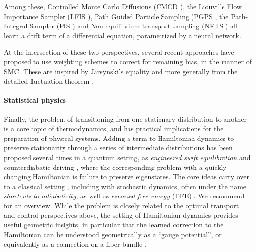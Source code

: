 \documentclass{article}
\begin{document}
Among these, Controlled Monte Carlo Diffusions (CMCD \cite{vargas2023transport}), the Liouville Flow Importance Sampler (LFIS \cite{tian2024liouville}), Path Guided Particle Sampling (PGPS \cite{fan2024path}, the Path-Integral Sampler (PIS \cite{zhang2021path}) and Non-equilibrium transport sampling (NETS \cite{albergo2024nets}) all learn a drift term of a differential equation, parametrized by a neural network.


At the intersection of these two perspectives, several recent approaches \cite{albergo2024nets, vargas2023transport} have proposed to use weighting schemes to correct for remaining bias, in the manner of SMC. These are inspired by Jarsynski's equality \cite{jarzynski1997nonequilibrium} and more generally from the detailed fluctuation theorem \cite{crooks1998nonequilibrium}.

\paragraph{Statistical physics} Finally, the problem of transitioning from one stationary distribution to another is a core topic of thermodynamics, and has practical implications for the preparation of physical systems. Adding a term to Hamiltonian dynamics to preserve stationarity through a series of intermediate distributions has been proposed several times in a quantum setting, as \emph{engineered swift equilibration} \cite{martinez2016engineered} and counterdiabatic driving \cite{demirplak2003adiabatic}, where the corresponding problem with a quickly changing Hamiltonian is failure to preserve eigenstates. The core ideas carry over to a classical setting \cite{patra2017shortcuts}, including with stochastic dynamics, often under the name \emph{shortcuts to adiabaticity}, as well as \emph{escorted free energy} (EFE) \cite{vaikuntanathan2011escorted}. We recommend \cite{guery2019shortcuts} for an overview. While the problem is closely related to the optimal transport and control perspectives above, the setting of Hamiltonian dynamics provides useful geometric insights, in particular that the  learned correction to the Hamiltonian can be understood geometrically as a ``gauge potential'', or equivalently as a connection on a fiber bundle \cite{kolodrubetz2017geometry}.
\end{document}
